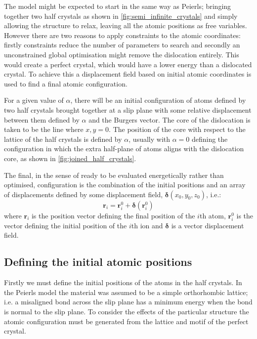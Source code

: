 


The model might be expected to start in the same way as Peierls; bringing together two half crystals as shown in \autoref{fig:semi_infinite_crystals} and simply allowing the structure to relax, leaving all the atomic positions as free variables. However there are two reasons to apply constraints to the atomic coordinates: firstly constraints reduce the number of parameters to search and secondly an unconstrained global optimisation might remove the dislocation entirely. This would create a perfect crystal, which would have a lower energy than a dislocated crystal. To achieve this a displacement field based on initial atomic coordinates is used to find a final atomic configuration.

For a given value of $\alpha$, there will be an initial configuration of atoms defined by two half crystals brought together at a slip plane with some relative displacement between them defined by $\alpha$ and the Burgers vector. The core of the dislocation is taken to be the line where $x,y = 0$. The position of the core with respect to the lattice of the half crystals is defined by $\alpha$, usually with $\alpha=0$ defining the configuration in which the extra half-plane of atoms aligns with the dislocation core, as shown in \autoref{fig:joined_half_crystals}. 

The final, in the sense of ready to be evaluated energetically rather than optimised, configuration is the combination of  the initial positions and an array of displacements defined by some displacement field, $\bm{\delta}(x_0, y_0, z_0)$, i.e.:
\begin{equation}
\mathbf{r}_i = \mathbf{r}_i^0 + \bm{\delta}(\bm{r}_i^0)
\end{equation}
where $\mathbf{r}_i$ is the position vector defining the final position of the $i$th atom, $\mathbf{r}_i^0$ is the vector defining the initial position of the $i$th ion and $\bm{\delta}$ is a vector displacement field.


%
%
\subsection{Defining the initial atomic positions}


Firstly we must define the initial positions of the atoms in the half crystals. In the Peierls model the material was assumed to be a simple orthorhombic lattice; i.e. a misaligned  bond across the slip plane has a minimum energy when the bond is normal to the slip plane. To consider the effects of the particular structure the atomic configuration must be generated from the lattice and motif of the perfect crystal.

